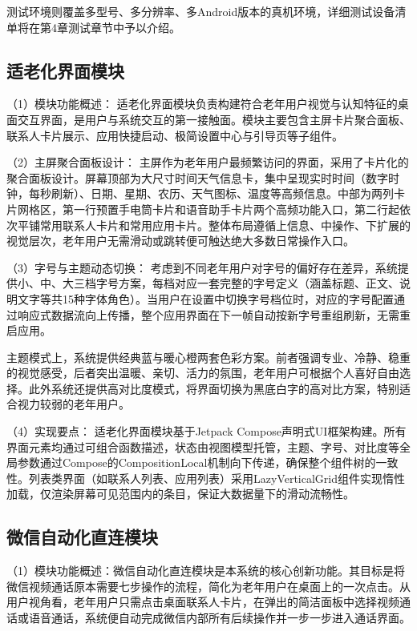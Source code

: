 测试环境则覆盖多型号、多分辨率、多Android版本的真机环境，详细测试设备清单将在第4章测试章节中予以介绍。

\subsection{适老化界面模块}

（1）模块功能概述：
适老化界面模块负责构建符合老年用户视觉与认知特征的桌面交互界面，是用户与系统交互的第一接触面。模块主要包含主屏卡片聚合面板、联系人卡片展示、应用快捷启动、极简设置中心与引导页等子组件。

（2）主屏聚合面板设计：
主屏作为老年用户最频繁访问的界面，采用了卡片化的聚合面板设计。屏幕顶部为大尺寸时间天气信息卡，集中呈现实时时间（数字时钟，每秒刷新）、日期、星期、农历、天气图标、温度等高频信息。中部为两列卡片网格区，第一行预置手电筒卡片和语音助手卡片两个高频功能入口，第二行起依次平铺常用联系人卡片和常用应用卡片。整体布局遵循上信息、中操作、下扩展的视觉层次，老年用户无需滑动或跳转便可触达绝大多数日常操作入口。

（3）字号与主题动态切换：
考虑到不同老年用户对字号的偏好存在差异，系统提供小、中、大三档字号方案，每档对应一套完整的字号定义（涵盖标题、正文、说明文字等共15种字体角色）。当用户在设置中切换字号档位时，对应的字号配置通过响应式数据流向上传播，整个应用界面在下一帧自动按新字号重组刷新，无需重启应用。

主题模式上，系统提供经典蓝与暖心橙两套色彩方案。前者强调专业、冷静、稳重的视觉感受，后者突出温暖、亲切、活力的氛围，老年用户可根据个人喜好自由选择。此外系统还提供高对比度模式，将界面切换为黑底白字的高对比方案，特别适合视力较弱的老年用户。

（4）实现要点：
适老化界面模块基于Jetpack Compose声明式UI框架构建。所有界面元素均通过可组合函数描述，状态由视图模型托管，主题、字号、对比度等全局参数通过Compose的CompositionLocal机制向下传递，确保整个组件树的一致性。列表类界面（如联系人列表、应用列表）采用LazyVerticalGrid组件实现惰性加载，仅渲染屏幕可见范围内的条目，保证大数据量下的滑动流畅性。

\subsection{微信自动化直连模块}
（1）模块功能概述：微信自动化直连模块是本系统的核心创新功能。其目标是将微信视频通话原本需要七步操作的流程，简化为老年用户在桌面上的一次点击。从用户视角看，老年用户只需点击桌面联系人卡片，在弹出的简洁面板中选择视频通话或语音通话，系统便自动完成微信内部所有后续操作并一步一步进入通话界面。

